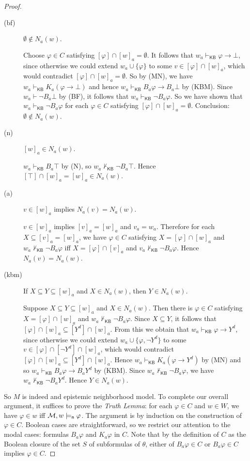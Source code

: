 \documentclass[12pt]{article}
\theoremstyle{definition}
\newcommand{\M}{{\cal M}}      %
\newcommand{\KB}{{\mathsf{KB}}}                        %
\newcommand{\modelsn}{\models_{\mathsf{n}}}                  %
\begin{document}
\begin{proof}
\begin{description}
  \item[(bf)] $\emptyset\notin N_a(w)$.

    Choose $\varphi\in C$ satisfying $[\varphi]\cap[w]_a=\emptyset$.
    It follows that $w_a\vdash_\KB\varphi\to\bot$, since otherwise we
    could extend $w_a\cup\{\varphi\}$ to some
    $v\in[\varphi]\cap[w]_a$, which would contradict
    $[\varphi]\cap[w]_a=\emptyset$.  So by (MN), we have
    $w_a\vdash_\KB K_a(\varphi\to\bot)$ and hence $w_a\vdash_\KB
    B_a\varphi\to B_a\bot$ by (KBM).  Since $w_a\vdash\lnot B_a\bot$
    by (BF), it follows that $w_a\vdash_\KB \lnot B_a\varphi$.  So we
    have shown that $w_a\vdash_\KB \lnot B_a\varphi$ for each
    $\varphi\in C$ satisfying $[\varphi]\cap[w]_a=\emptyset$.
    Conclusion: $\emptyset\notin N_a(w)$.

  \item[(n)] $[w]_a\in N_a(w)$.

    $w_a\vdash_\KB B_a\top$ by (N), so $w_a\nvdash_\KB\lnot B_a\top$.
    Hence $[\top]\cap[w]_a=[w]_a\in N_a(w)$.

  \item[(a)] $v\in[w]_a$ implies $N_a(v)=N_a(w)$.

    $v\in[w]_a$ implies $[v]_a=[w]_a$ and $v_a=w_a$.  Therefore for
    each $X\subseteq[v]_a=[w]_a$, we have $\varphi\in C$ satisfying
    $X=[\varphi]\cap[w]_a$ and $w_a\nvdash_\KB \lnot B_a\varphi$ iff
    $X=[\varphi]\cap[v]_a$ and $v_a\nvdash_\KB \lnot B_a\varphi$.
    Hence $N_a(v)=N_a(w)$.

  \item[(kbm)] If $X\subseteq Y\subseteq[w]_a$ and $X\in N_a(w)$, then
    $Y\in N_a(w)$.

    Suppose $X\subseteq Y\subseteq[w]_a$ and $X\in N_a(w)$. Then there
    is $\varphi\in C$ satisfying $X=[\varphi]\cap[w]_a$ and
    $w_a\nvdash_\KB \lnot B_a\varphi$.  Since $X\subseteq Y$, it
    follows that $[\varphi]\cap[w]_a\subseteq[Y^d]\cap[w]_a$. From
    this we obtain that $w_a\vdash_\KB\varphi\to Y^d$, since otherwise
    we could extend $w_a\cup\{\varphi,\lnot Y^d\}$ to some
    $v\in[\varphi]\cap[\lnot Y^d]\cap[w]_a$, which would contradict
    $[\varphi]\cap[w]_a\subseteq[Y^d]\cap[w]_a$.  Hence $w_a\vdash_\KB
    K_a(\varphi\to Y^d)$ by (MN) and so $w_a\vdash_\KB B_a\varphi\to
    B_a Y^d$ by (KBM).  Since $w_a\nvdash_\KB \lnot B_a\varphi$, we
    have $w_a\nvdash_\KB \lnot B_aY^d$.  Hence $Y\in N_a(w)$.
  \end{description}
  So $M$ is indeed and epistemic neighborhood model. To complete our
  overall argument, it suffices to prove the \emph{Truth Lemma\/}: for
  each $\varphi\in C$ and $w\in W$, we have $\varphi\in w$ iff
  $\M,w\modelsn\varphi$. The argument is by induction on the
  construction of $\varphi\in C$.  Boolean cases are straightforward,
  so we restrict our attention to the modal cases: formulas
  $B_a\varphi$ and $K_a\varphi$ in $C$.  Note that by the definition
  of $C$ as the Boolean closure of the set $S$ of subformulas of
  $\theta$, either of $B_a\varphi\in C$ or $B_a\varphi\in C$ implies
  $\varphi\in C$.


\end{proof}
\end{document}
